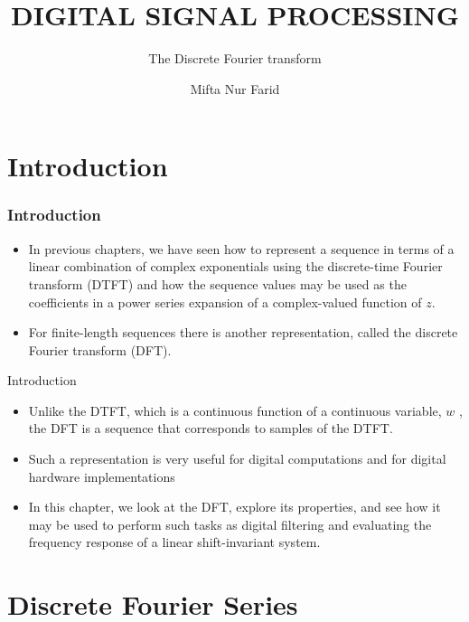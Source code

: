 \documentclass[pdflatex,compress,mathserif]{beamer}
\title{DIGITAL SIGNAL PROCESSING}
\subtitle{The Discrete Fourier transform}
\author{Mifta Nur Farid}
\begin{document}
\maketitle

\section{Introduction}

\begin{frame}
	\frametitle{Introduction}
	\begin{itemize}
		\item In previous chapters, we have seen how to represent a sequence in terms of a linear combination of complex exponentials using the discrete-time Fourier transform (DTFT) and how the sequence values may be used as the coefficients in a power series expansion of a complex-valued function of $ z $.
		\item For finite-length sequences there is another representation, called the discrete Fourier transform (DFT).
	\end{itemize}
\end{frame}

\begin{frame}{Introduction}
	\begin{itemize}
		\item Unlike the DTFT, which is a continuous function of a continuous variable, $ w $ , the DFT is a sequence that corresponds to samples of the DTFT.
		\item Such a representation is very useful for digital computations and for digital hardware implementations
		\item In this chapter, we look at the DFT, explore its properties, and see how it may be used to perform such tasks as digital filtering and evaluating the frequency response of a linear shift-invariant system.
	\end{itemize}
\end{frame}

\section{Discrete Fourier Series}
\end{document}
